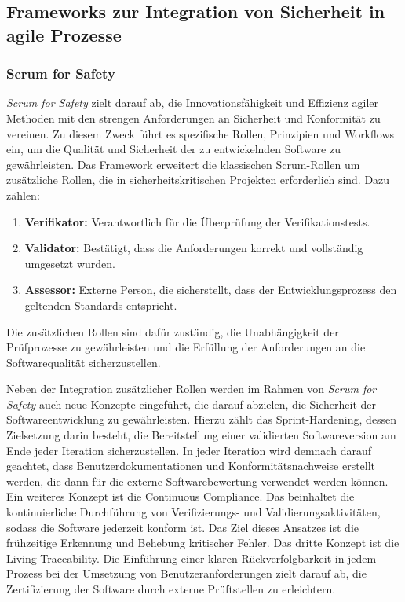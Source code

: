 \documentclass[acmtog]{acmart}
\begin{document}
\subsection{Frameworks zur Integration von Sicherheit in agile Prozesse}

\subsubsection{Scrum for Safety}

\textit{Scrum for Safety} zielt darauf ab, die Innovationsfähigkeit und Effizienz agiler Methoden mit den strengen Anforderungen an Sicherheit und Konformität zu vereinen. 
Zu diesem Zweck führt es spezifische Rollen, Prinzipien und Workflows ein, um die Qualität und Sicherheit der zu entwickelnden Software zu gewährleisten. 
Das Framework erweitert die klassischen Scrum-Rollen um zusätzliche Rollen, die in sicherheitskritischen Projekten erforderlich sind. \cite{barbareschi_scrum_2022} Dazu zählen: 

\begin{enumerate}
  \item \textbf{Verifikator:} Verantwortlich für die Überprüfung der Verifikationstests.
  \item \textbf{Validator:} Bestätigt, dass die Anforderungen korrekt und vollständig umgesetzt wurden.
  \item \textbf{Assessor:} Externe Person, die sicherstellt, dass der Entwicklungsprozess den geltenden Standards entspricht.
\end{enumerate}

Die zusätzlichen Rollen sind dafür zuständig, 
die Unabhängigkeit der Prüfprozesse zu gewährleisten und die Erfüllung der Anforderungen an die Softwarequalität sicherzustellen. \cite{barbareschi_scrum_2022}

Neben der Integration zusätzlicher Rollen werden im Rahmen von \textit{Scrum for Safety} auch neue Konzepte eingeführt, die darauf abzielen, die Sicherheit der Softwareentwicklung zu gewährleisten. 
Hierzu zählt das Sprint-Hardening, dessen Zielsetzung darin besteht, die Bereitstellung einer validierten Softwareversion am Ende jeder Iteration sicherzustellen. In jeder Iteration wird demnach darauf geachtet, 
dass Benutzerdokumentationen und Konformitätsnachweise erstellt werden, die dann für die externe Softwarebewertung verwendet werden können. \cite{barbareschi_scrum_2022}
Ein weiteres Konzept ist die Continuous Compliance. Das beinhaltet die kontinuierliche Durchführung von Verifizierungs- und Validierungsaktivitäten, sodass die Software jederzeit konform ist. 
Das Ziel dieses Ansatzes ist die frühzeitige Erkennung und Behebung kritischer Fehler. \cite{barbareschi_scrum_2022} Das dritte Konzept ist die Living Traceability.
Die Einführung einer klaren Rückverfolgbarkeit in jedem Prozess bei der Umsetzung von Benutzeranforderungen zielt darauf ab, die Zertifizierung der Software durch externe Prüftstellen zu erleichtern. \cite{barbareschi_scrum_2022}
\end{document}
